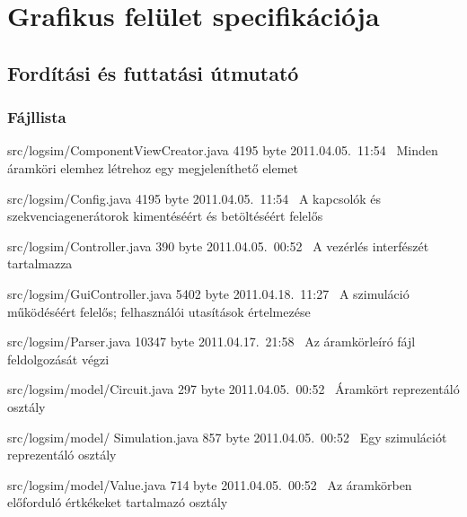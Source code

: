 %
\chapter{Grafikus felület specifikációja}

\thispagestyle{fancy}

\section{Fordítási és futtatási útmutató}

\subsection{Fájllista}

\begin{fajllista}

\fajl
{src/logsim/ComponentViewCreator.java} %
{4195 byte} %
{2011.04.05.~11:54~} %
{Minden áramköri elemhez létrehoz egy megjeleníthető elemet} %

\fajl
{src/logsim/Config.java} %
{4195 byte} %
{2011.04.05.~11:54~} %
{A kapcsolók és szekvenciagenerátorok kimentéséért és betöltéséért felelős} %

\fajl
{src/logsim/Controller.java} %
{390 byte} %
{2011.04.05.~00:52~} %
{A vezérlés interfészét tartalmazza} %

\fajl
{src/logsim/GuiController.java} %
{5402 byte} %
{2011.04.18.~11:27~} %
{A szimuláció működéséért felelős; felhasználói utasítások értelmezése} %

\fajl
{src/logsim/Parser.java} %
{10347 byte} %
{2011.04.17.~21:58~} %
{Az áramkörleíró fájl feldolgozását végzi} %

\fajl
{src/logsim/model/Circuit.java} %
{297 byte} %
{2011.04.05.~00:52~} %
{Áramkört reprezentáló osztály} %

\fajl
{src/logsim/model/\newline
Simulation.java} %
{857 byte} %
{2011.04.05.~00:52~} %
{Egy szimulációt reprezentáló osztály} %

\fajl
{src/logsim/model/Value.java} %
{714 byte} %
{2011.04.05.~00:52~} %
{Az áramkörben előforduló értkékeket tartalmazó osztály} %


\end{fajllista}

